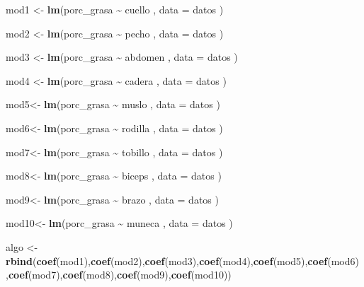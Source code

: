 \documentclass[
]{article}
\newenvironment{Shaded}{\begin{snugshade}}{\end{snugshade}}
\newcommand{\AttributeTok}[1]{\textcolor[rgb]{0.13,0.29,0.53}{#1}}
\newcommand{\FunctionTok}[1]{\textcolor[rgb]{0.13,0.29,0.53}{\textbf{#1}}}
\newcommand{\NormalTok}[1]{#1}
\newcommand{\OtherTok}[1]{\textcolor[rgb]{0.56,0.35,0.01}{#1}}
\newcommand{\SpecialCharTok}[1]{\textcolor[rgb]{0.81,0.36,0.00}{\textbf{#1}}}
\begin{document}
\begin{Shaded}
\begin{Highlighting}[]
\NormalTok{mod1 }\OtherTok{\textless{}{-}} \FunctionTok{lm}\NormalTok{(porc\_grasa }\SpecialCharTok{\textasciitilde{}}\NormalTok{ cuello , }\AttributeTok{data =}\NormalTok{ datos )}

\NormalTok{mod2 }\OtherTok{\textless{}{-}} \FunctionTok{lm}\NormalTok{(porc\_grasa }\SpecialCharTok{\textasciitilde{}}\NormalTok{  pecho , }\AttributeTok{data =}\NormalTok{ datos )}

\NormalTok{mod3 }\OtherTok{\textless{}{-}} \FunctionTok{lm}\NormalTok{(porc\_grasa }\SpecialCharTok{\textasciitilde{}}\NormalTok{  abdomen , }\AttributeTok{data =}\NormalTok{ datos )}

\NormalTok{mod4 }\OtherTok{\textless{}{-}} \FunctionTok{lm}\NormalTok{(porc\_grasa }\SpecialCharTok{\textasciitilde{}}\NormalTok{  cadera , }\AttributeTok{data =}\NormalTok{ datos )}

\NormalTok{mod5}\OtherTok{\textless{}{-}} \FunctionTok{lm}\NormalTok{(porc\_grasa }\SpecialCharTok{\textasciitilde{}}\NormalTok{  muslo , }\AttributeTok{data =}\NormalTok{ datos )}

\NormalTok{mod6}\OtherTok{\textless{}{-}} \FunctionTok{lm}\NormalTok{(porc\_grasa }\SpecialCharTok{\textasciitilde{}}\NormalTok{  rodilla , }\AttributeTok{data =}\NormalTok{ datos )}

\NormalTok{mod7}\OtherTok{\textless{}{-}} \FunctionTok{lm}\NormalTok{(porc\_grasa }\SpecialCharTok{\textasciitilde{}}\NormalTok{  tobillo , }\AttributeTok{data =}\NormalTok{ datos )}

\NormalTok{mod8}\OtherTok{\textless{}{-}} \FunctionTok{lm}\NormalTok{(porc\_grasa }\SpecialCharTok{\textasciitilde{}}\NormalTok{  biceps , }\AttributeTok{data =}\NormalTok{ datos )}

\NormalTok{mod9}\OtherTok{\textless{}{-}} \FunctionTok{lm}\NormalTok{(porc\_grasa }\SpecialCharTok{\textasciitilde{}}\NormalTok{  brazo , }\AttributeTok{data =}\NormalTok{ datos )}

\NormalTok{mod10}\OtherTok{\textless{}{-}} \FunctionTok{lm}\NormalTok{(porc\_grasa }\SpecialCharTok{\textasciitilde{}}\NormalTok{  muneca , }\AttributeTok{data =}\NormalTok{ datos )}

\NormalTok{algo }\OtherTok{\textless{}{-}} \FunctionTok{rbind}\NormalTok{(}\FunctionTok{coef}\NormalTok{(mod1),}\FunctionTok{coef}\NormalTok{(mod2),}\FunctionTok{coef}\NormalTok{(mod3),}\FunctionTok{coef}\NormalTok{(mod4),}\FunctionTok{coef}\NormalTok{(mod5),}\FunctionTok{coef}\NormalTok{(mod6)}
\NormalTok{      ,}\FunctionTok{coef}\NormalTok{(mod7),}\FunctionTok{coef}\NormalTok{(mod8),}\FunctionTok{coef}\NormalTok{(mod9),}\FunctionTok{coef}\NormalTok{(mod10))}


\end{Highlighting}
\end{Shaded}
\end{document}
